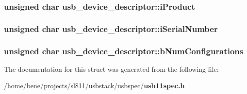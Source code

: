 \subsubsection{\setlength{\rightskip}{0pt plus 5cm}unsigned char {\bf usb\_\-device\_\-descriptor::i\-Product}}\label{structusb__device__descriptor_50b0d6115265610c7b0f12eb930e79bc}


\subsubsection{\setlength{\rightskip}{0pt plus 5cm}unsigned char {\bf usb\_\-device\_\-descriptor::i\-Serial\-Number}}\label{structusb__device__descriptor_0a7877c6463a0c78619aec4db6fa6676}


\subsubsection{\setlength{\rightskip}{0pt plus 5cm}unsigned char {\bf usb\_\-device\_\-descriptor::b\-Num\-Configurations}}\label{structusb__device__descriptor_5e875fff283a818dcd4a32484c699d50}




The documentation for this struct was generated from the following file:\begin{CompactItemize}
\item 
/home/bene/projects/sl811/usbstack/usbspec/{\bf usb11spec.h}\end{CompactItemize}
